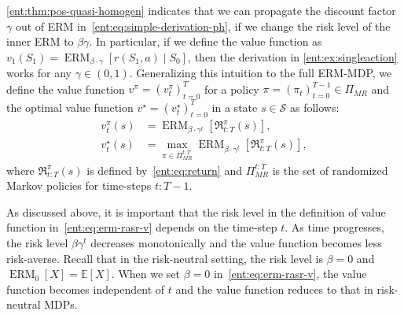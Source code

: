\documentclass[twoside]{article}
\newcommand{\E}{\mathbb{E}}
\newcommand{\states}{\mathcal{S}}
\newcommand{\opt}{^\star}
\newcommand{\erm}[2]{\operatorname{ERM}_{#1}\left[#2\right]}
\theoremstyle{plain}
\theoremstyle{definition}
\theoremstyle{remark}
\begin{document}
\cref{ent:thm:pos-quasi-homogen} indicates that we can propagate the discount factor $\gamma$ out of ERM in~\eqref{ent:eq:simple-derivation-ph}, if we change the risk level of the inner ERM to $\beta\gamma$. In particular, if we define the value function as $v_1(S_1) = \erm{\beta\cdot \gamma}{r(S_1,a) \mid S_0}$, then the derivation in \cref{ent:ex:singleaction} works for any $\gamma \in (0,1)$. Generalizing this intuition to the full ERM-MDP, we define the value function $v^\pi=(v^\pi_t)_{t=0}^T$ for a policy $\pi = (\pi_t)_{t=0}^{T-1}\in \Pi_{MR}$ and the optimal value function  $v\opt  = (v_t\opt)_{t=0}^T$ in a state $s\in\states$ as follows: 
%
\begin{align}
 \label{ent:eq:erm-rasr-v}
v^\pi_t(s) &= \erm{\beta\cdot \gamma^{t}} {\mathfrak{R}^{\pi}_{t{:}T}(s)}, \\
 \label{ent:eq:erm-rasr-v-opt}
v\opt_t(s)  &= \max_{\pi \in \Pi_{MR}^{t{:}T}} \erm{\beta\cdot \gamma^{t}} { \mathfrak{R}^{\pi}_{t{:}T}(s)},
\end{align}
%
where $\mathfrak{R}^{\pi}_{t{:}T}(s)$ is defined by~\eqref{ent:eq:return} and $\Pi_{MR}^{t{:}T}$ is the set of randomized Markov policies for time-steps $t{:}T{-}1$.

As discussed above, it is important that the risk level in the definition of value function in~\eqref{ent:eq:erm-rasr-v} depends on the time-step $t$. As time progresses, the risk level $\beta\gamma^t$ decreases monotonically and the value function becomes less risk-averse. Recall that in the risk-neutral setting, the risk level is $\beta = 0$ and $\erm{0}{X} = \E[X]$. When we set $\beta=0$ in~\eqref{ent:eq:erm-rasr-v}, the value function becomes independent of $t$ and the value function reduces to that in risk-neutral MDPs. 
\end{document}
